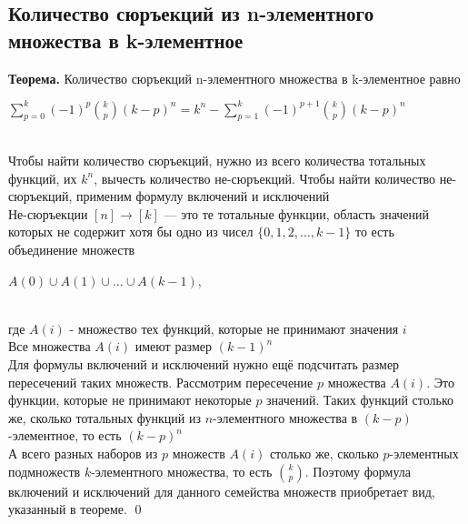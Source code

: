 \documentclass[a4paper]{article}
\begin{document}
\subsection{Количество сюръекций из n-элементного множества в k-элементное}
\textbf{Теорема.} Количество сюръекций n-элементного множества в k-элементное равно\\[2mm]
\centerline{$\sum\limits_{p=0}^k(-1)^p\binom{k}{p}(k-p)^n=k^n-\sum\limits_{p=1}^k(-1)^{p+1}\binom{k}{p}(k-p)^n$}\\[2mm]
 Чтобы найти количество сюръекций, нужно из всего количества тотальных функций, их $k^n$, вычесть количество не-сюръекций. Чтобы найти количество не-сюръекций, применим формулу включений и исключений\\[2mm]
 Не-сюръекции $[n]\rightarrow[k]$ — это те тотальные функции, область значений которых не содержит хотя бы одно из чисел $\{0,1,2,\ldots,k-1\}$ то есть объединение множеств\\[2mm]
\centerline{$A(0) \cup A(1) \cup \ldots \cup A(k-1)$,}\\[2mm]
где $A(i)$ - множество тех функций, которые не принимают значения $i$\\[2mm]
 Все множества $A(i)$ имеют размер $(k-1)^n$\\[2mm]
 Для формулы включений и исключений нужно ещё подсчитать размер пересечений таких множеств. Рассмотрим пересечение $p$ множества $A(i)$. Это функции, которые не принимают некоторые $p$ значений. Таких функций столько же, сколько тотальных функций из $n$-элементного множества в $(k-p)$-элементное, то есть $(k-p)^n$\\[2mm]
 А всего разных наборов из $p$ множеств $A(i)$ столько же, сколько $p$-элементных подмножеств $k$-элементного множества, то есть $\binom{k}{p}$. Поэтому формула включений и исключений для данного семейства множеств приобретает вид, указанный в теореме. \qed
\end{document}

